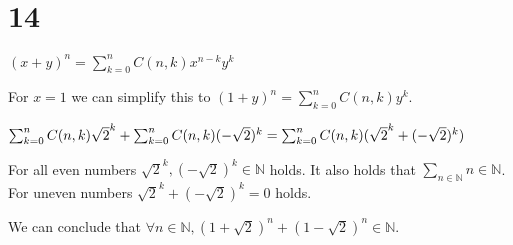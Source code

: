 \documentclass[12pt]{article}
\begin{document}
\section*{14}
$(x + y)^n = \sum_{k = 0}^{n} C(n, k) x^{n - k} y^k$

For $x = 1$ we can simplify this to $(1 + y)^n = \sum_{k = 0}^{n} C(n, k) y^k$.

$\sum_{k = 0}^{n} C(n, k) \sqrt{2}^k + \sum_{k = 0}^{n} C(n, k) (-\sqrt{2})^k\\
=\sum_{k = 0}^{n} C(n, k)(\sqrt{2}^k + (-\sqrt{2})^k)$


For all even numbers $\sqrt{2}^k, (-\sqrt{2})^k \in \mathbb{N}$ holds. It also holds that $\sum_{n \in \mathbb{N}} n \in \mathbb{N}$.\\
For uneven numbers $\sqrt{2}^k + (-\sqrt{2})^k = 0$ holds.

We can conclude that $\forall n \in \mathbb{N}, (1 + \sqrt{2})^n + (1 - \sqrt{2})^n \in \mathbb{N}$.
\end{document}
